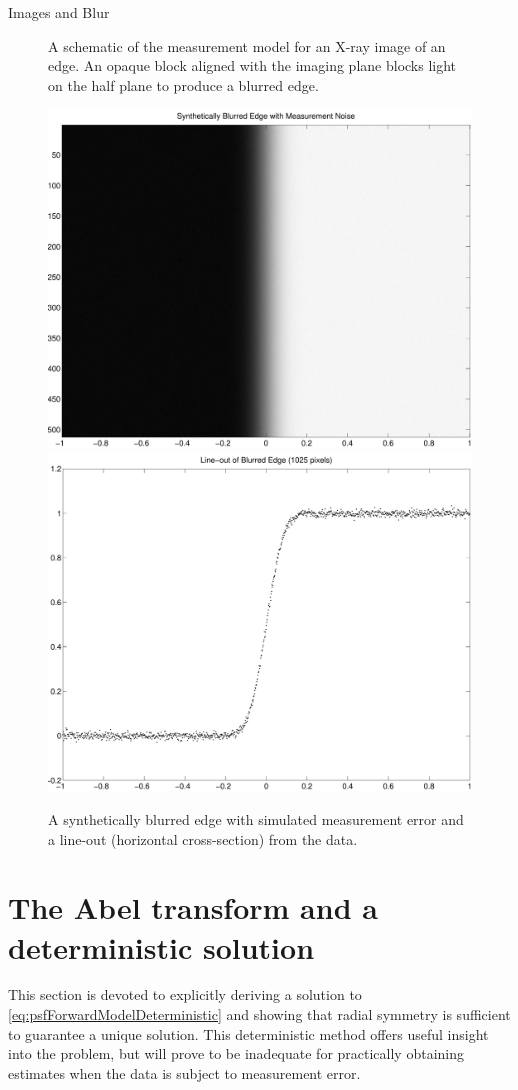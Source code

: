 \begin{chapter}{Images and Blur}
\begin{figure}
\begin{center}
\begin{tikzpicture}[scale=.8,every node/.style={minimum size=1cm},on grid]
    \end{tikzpicture}
  \caption{ A schematic of the measurement model for an X-ray image of an edge. An opaque block aligned with the imaging plane blocks light on the half plane to produce a blurred edge.}\label{fig:edgePicture}
\end{center}
\end{figure}

\begin{figure}
\begin{center}
  \includegraphics[width=.45\textwidth]{figures/blurredEdgeData.pdf}
  \includegraphics[width=.45\textwidth]{figures/psfLineoutData.pdf}
  \caption{A synthetically blurred edge with simulated measurement error and a line-out (horizontal cross-section) from the data.} \label{fig:edgeData}
\end{center}
\end{figure}
  
\section{The Abel transform and a deterministic solution}

  This section is devoted to explicitly deriving a solution to \eqref{eq:psfForwardModelDeterministic} and showing that radial symmetry is sufficient to guarantee a unique solution.
  This deterministic method offers useful insight into the problem, but will prove to be inadequate for practically obtaining estimates when the data is subject to measurement error.


\end{chapter}
